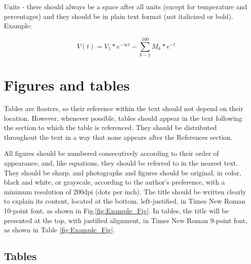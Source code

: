 \documentclass[a4paper,twocolumn,10.5pt]{article}
\begin{document}
Units - there should always be a space after all units (except for temperature and percentages) and they should be in plain text format (not italicized or bold).
Example:

\begin{equation}
V(t) = V_{1}*e^{-\infty t } - \sum_{k-1}^{100}M_{k}*e^{-t}
\end{equation}

\section*{Figures and tables}


Tables are floaters, so their reference within the text should not depend on their location. However, whenever possible, tables should appear in the text following the section to which the table is referenced. They should be distributed throughout the text in a way that none appears after the References section.

All figures should be numbered consecutively according to their order of appearance, and, like equations, they should be referred to in the nearest text. They should be sharp, and photographs and figures should be original, in color, black and white, or grayscale, according to the author's preference, with a minimum resolution of 200dpi (dots per inch). The title should be written clearly to explain its content, located at the bottom, left-justified, in Times New Roman 10-point font, as shown in Fig.\ref{fig:Example_Fig}. In tables, the title will be presented at the top, with justified alignment, in Times New Roman 9-point font, as shown in Table \ref{fig:Example_Fig}.





\subsection{Tables} 
\end{document}

